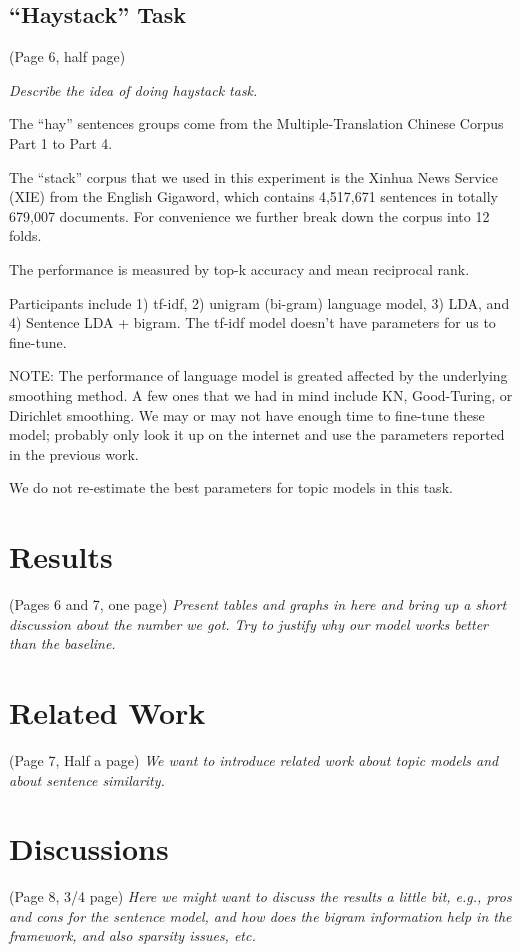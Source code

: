 \subsection{``Haystack'' Task}
(Page 6, half page) { \it Describe the idea of doing haystack task. 

The ``hay'' sentences groups come from the Multiple-Translation Chinese Corpus
Part 1 to Part 4.  

The ``stack'' corpus that we used in this experiment is the Xinhua News Service
(XIE) from the English Gigaword, which contains 4,517,671 sentences in totally
679,007 documents.  For convenience we further break down the corpus into 12
folds.

The performance is measured by top-k accuracy and mean reciprocal rank.

Participants include 1) tf-idf, 2) unigram (bi-gram) language model, 3) LDA,
and 4) Sentence LDA + bigram.  The tf-idf model doesn't have parameters for us
to fine-tune.

NOTE: The performance of language model is greated affected by the underlying
smoothing method.  A few ones that we had in mind include KN, Good-Turing, or
Dirichlet smoothing.  We may or may not have enough time to fine-tune these
model; probably only look it up on the internet and use the parameters reported
in the previous work.

We do not re-estimate the best parameters for topic models in this task. }

\section{Results} (Pages 6 and 7, one page) { \it Present tables and graphs in
here and bring up a short discussion about the number we got.  Try to justify
why our model works better than the baseline. }

\section{Related Work} (Page 7, Half a page)  { \it We want to introduce related work
about topic models and about sentence similarity. }

\section{Discussions} (Page 8, 3/4 page)  { \it Here we might want to discuss the
results a little bit, e.g., pros and cons for the sentence model, and how does
the bigram information help in the framework, and also sparsity issues, etc. }

